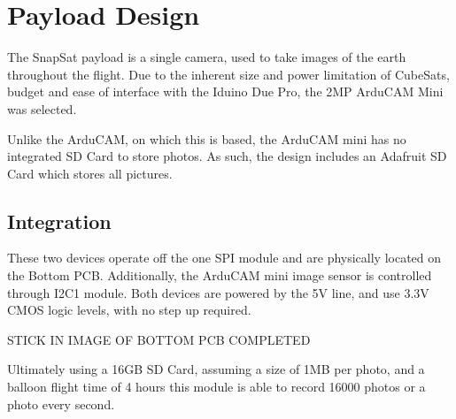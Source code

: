 \section{Payload Design}

The SnapSat payload is a single camera, used to take images of the earth throughout the flight.
Due to the inherent size and power limitation of CubeSats, budget and ease of interface with the Iduino Due Pro, the 2MP ArduCAM Mini was selected.

\begin{figure}[H]
    \label{fig:arducam}
\end{figure}

Unlike the ArduCAM, on which this is based, the ArduCAM mini has no integrated SD Card to store photos.  As such, the design includes an Adafruit SD Card which stores all pictures.

\begin{figure}[H]
    \label{fig:sdcard}
\end{figure}

\subsection{Integration}

These two devices operate off the one SPI module and are physically located on the Bottom PCB.  Additionally, the ArduCAM mini image sensor is controlled through I2C1 module.  Both devices are powered by the 5V line, and use 3.3V CMOS logic levels, with no step up required.

STICK IN IMAGE OF BOTTOM PCB COMPLETED

Ultimately using a 16GB SD Card, assuming a size of 1MB per photo, and a balloon flight time of 4 hours this module is able to record 16000 photos or a photo every second.